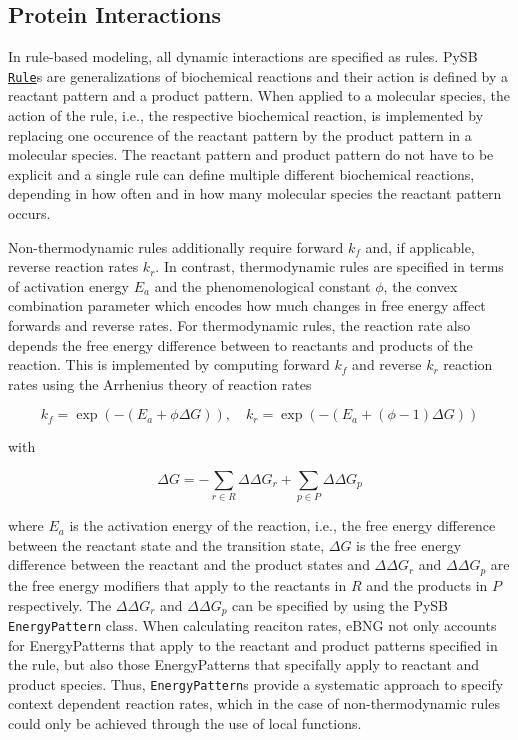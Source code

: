 \documentclass[11pt]{article}
\begin{document}
    \hypertarget{protein-interactions}{%
\subsection{Protein Interactions}\label{protein-interactions}}

In rule-based modeling, all dynamic interactions are specified as rules.
PySB
\href{https://pysb.readthedocs.io/en/stable/modules/core.html\#pysb.core.Rule}{\texttt{Rule}}s
are generalizations of biochemical reactions and their action is defined
by a reactant pattern and a product pattern. When applied to a molecular
species, the action of the rule, i.e., the respective biochemical
reaction, is implemented by replacing one occurence of the reactant
pattern by the product pattern in a molecular species. The reactant
pattern and product pattern do not have to be explicit and a single rule
can define multiple different biochemical reactions, depending in how
often and in how many molecular species the reactant pattern occurs.

Non-thermodynamic rules additionally require forward \(k_f\) and, if
applicable, reverse reaction rates \(k_r\). In contrast, thermodynamic
rules are specified in terms of activation energy \(E_a\) and the
phenomenological constant \(\phi\), the convex combination parameter
which encodes how much changes in free energy affect forwards and
reverse rates. For thermodynamic rules, the reaction rate also depends
the free energy difference between to reactants and products of the
reaction. This is implemented by computing forward \(k_f\) and reverse
\(k_r\) reaction rates using the Arrhenius theory of reaction rates

\[k_f=\exp( - (E_a + \phi \Delta G)), \quad k_r=\exp( - (E_a + (\phi - 1) \Delta G))\]

with

\[\Delta G = - \sum_{r \in R} \Delta \Delta G_r + \sum_{p \in P} \Delta \Delta G_p\]

where \(E_a\) is the activation energy of the reaction, i.e., the free
energy difference between the reactant state and the transition state,
\(\Delta G\) is the free energy difference between the reactant and the
product states and \(\Delta \Delta G_r\) and \(\Delta \Delta G_p\) are
the free energy modifiers that apply to the reactants in \(R\) and the
products in \(P\) respectively. The \(\Delta \Delta G_r\) and
\(\Delta \Delta G_p\) can be specified by using the PySB
\texttt{EnergyPattern} class. When calculating reaciton rates, eBNG not
only accounts for EnergyPatterns that apply to the reactant and product
patterns specified in the rule, but also those EnergyPatterns that
specifally apply to reactant and product species. Thus,
\texttt{EnergyPattern}s provide a systematic approach to specify context
dependent reaction rates, which in the case of non-thermodynamic rules
could only be achieved through the use of local functions.
\end{document}

